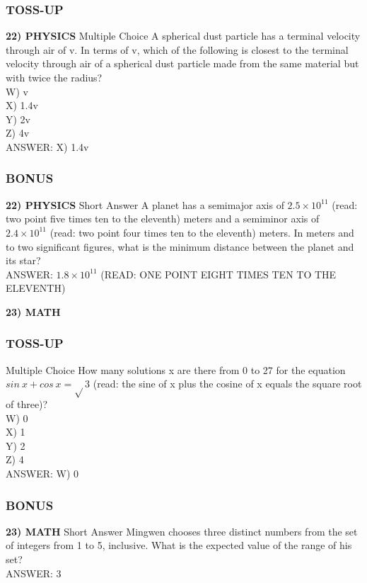 \newpage

\subsubsection*{TOSS-UP}
\textbf{22) PHYSICS}
Multiple Choice A spherical dust particle has a terminal velocity through air of v. In terms of v, which of the following is closest to the terminal velocity through air of a spherical dust particle made from the same material but with twice the radius?
\\W) v
\\X) 1.4v
\\Y) 2v
\\Z) 4v
\\ANSWER: X) 1.4v

\subsubsection*{BONUS}
\textbf{22) PHYSICS}
Short Answer A planet has a semimajor axis of $2.5\times10^{11}$ (read: two point five times ten to the eleventh) meters and a semiminor axis of $2.4\times10^{11}$ (read: two point four times ten to the eleventh) meters. In meters and to two significant figures, what is the minimum distance between the planet and its star?
\\ANSWER: $1.8\times10^{11}$ (READ: ONE POINT EIGHT TIMES TEN TO THE ELEVENTH)

\textbf{23) MATH}
\subsubsection*{TOSS-UP}
Multiple Choice How many solutions x are there from 0 to 27 for the equation $sin~x+cos~x=\sqrt{}3$ (read: the sine of x plus the cosine of x equals the square root of three)?
\\W) 0
\\X) 1
\\Y) 2
\\Z) 4
\\ANSWER: W) 0

\subsubsection*{BONUS}
\textbf{23) MATH}
Short Answer Mingwen chooses three distinct numbers from the set of integers from 1 to 5, inclusive. What is the expected value of the range of his set?
\\ANSWER: 3

